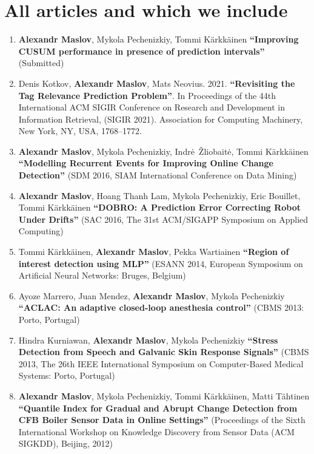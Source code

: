 \chapter{All articles and which we include}

\begin{enumerate}[leftmargin=0.2cm]

  \item \textbf{Alexandr Maslov}, Mykola Pechenizkiy, Tommi K\"{a}rkk\"{a}inen \textbf{``Improving CUSUM performance in presence of prediction intervals''} (Submitted)

  \item Denis Kotkov, \textbf{Alexandr Maslov}, Mats Neovius. 2021. \textbf{``Revisiting the Tag Relevance Prediction Problem''}. In Proceedings of the 44th International ACM SIGIR Conference on Research and Development in Information Retrieval, (SIGIR 2021). Association for Computing Machinery, New York, NY, USA, 1768–1772. %

  \item \textbf{Alexandr Maslov}, Mykola Pechenizkiy, Indr\.e~\v{Z}liobait\.e, Tommi K\"{a}rkk\"{a}inen \textbf{``Modelling Recurrent Events for Improving Online Change Detection''} (SDM 2016, SIAM International Conference on Data Mining)

  \item \textbf{Alexandr Maslov}, Hoang Thanh Lam, Mykola Pechenizkiy, Eric Bouillet, Tommi K\"{a}rkk\"{a}inen \textbf{``DOBRO: A Prediction Error Correcting Robot Under Drifts''} (SAC 2016, The 31st ACM/SIGAPP Symposium on Applied Computing)

  \item Tommi K\"{a}rkk\"{a}inen, \textbf{Alexandr Maslov}, Pekka Wartiainen
\textbf{``Region of interest detection using MLP''} (ESANN 2014, European Symposium on Artificial Neural Networks: Bruges, Belgium)

  \item Ayoze Marrero, Juan Mendez, \textbf{Alexandr Maslov}, Mykola Pechenizkiy \textbf{``ACLAC: An adaptive closed-loop anesthesia control''} (CBMS 2013: Porto, Portugal)

  \item Hindra Kurniawan, \textbf{Alexandr Maslov}, Mykola Pechenizkiy \textbf{``Stress Detection from Speech and Galvanic Skin Response Signals''} (CBMS 2013, The 26th IEEE International Symposium on Computer-Based Medical Systems: Porto, Portugal)

  \item \textbf{Alexandr Maslov}, Mykola Pechenizkiy, Tommi K\"{a}rkk\"{a}inen, Matti T\"{a}htinen
\textbf{``Quantile Index for Gradual and Abrupt Change Detection from CFB Boiler Sensor Data in Online Settings''}
(Proceedings of the Sixth International Workshop on Knowledge Discovery from Sensor Data (ACM SIGKDD), Beijing, 2012)


\end{enumerate}
